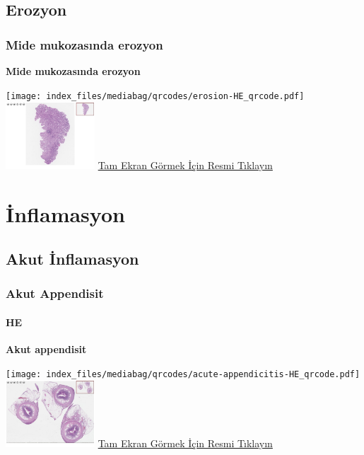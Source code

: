 \documentclass[
  letterpaper,
  DIV=11,
  numbers=noendperiod]{scrreprt}
\begin{document}
\hypertarget{sec-erozyon}{%
\chapter{Erozyon}\label{sec-erozyon}}

\hypertarget{sec-mide-mukozasinda-erozyon}{%
\section{Mide mukozasında erozyon}\label{sec-mide-mukozasinda-erozyon}}

\textbf{Mide mukozasında erozyon}

\texttt{[image: index\_files/mediabag/qrcodes/erosion-HE\_qrcode.pdf]}
\href{https://images.patolojiatlasi.com/erosion/HE.html}{\includegraphics[width=0.25\textwidth,height=\textheight]{./screenshots/thumbnail_erosion.png}}
\href{https://images.patolojiatlasi.com/erosion/HE.html}{Tam Ekran
Görmek İçin Resmi Tıklayın}

\part{İnflamasyon}

\hypertarget{sec-akut-inflamasyon}{%
\chapter{Akut İnflamasyon}\label{sec-akut-inflamasyon}}

\hypertarget{sec-akut-appendisit}{%
\section{Akut Appendisit}\label{sec-akut-appendisit}}

\hypertarget{he-4}{%
\subsection{HE}\label{he-4}}

\textbf{Akut appendisit}

\texttt{[image: index\_files/mediabag/qrcodes/acute-appendicitis-HE\_qrcode.pdf]}
\href{https://images.patolojiatlasi.com/acute-appendicitis/HE.html}{\includegraphics[width=0.25\textwidth,height=\textheight]{./screenshots/thumbnail_acute-appendicitis.png}}
\href{https://images.patolojiatlasi.com/acute-appendicitis/HE.html}{Tam
Ekran Görmek İçin Resmi Tıklayın}
\end{document}
